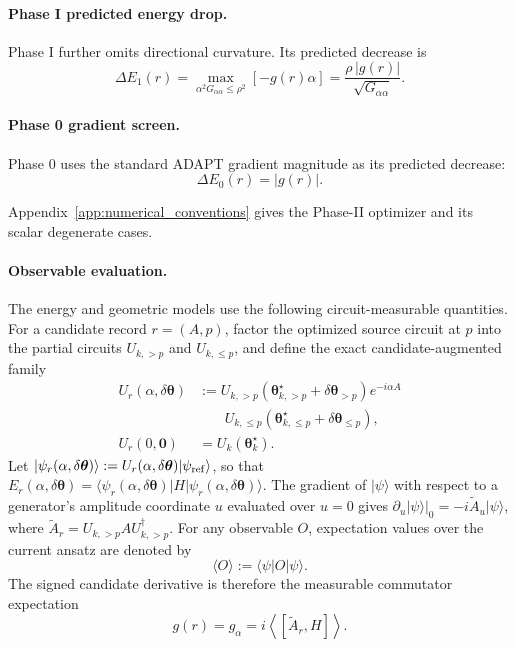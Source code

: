 \documentclass[
  reprint,
  amsmath,
  amssymb,
  aps,
  pra,
  nofootinbib,
  superscriptaddress,
  floatfix
]{revtex4-2}
\newcommand{\ket}[1]{|#1\rangle}
\newcommand{\bra}[1]{\langle #1|}
\begin{document}
\paragraph*{Phase I predicted energy drop.}
Phase I further omits directional curvature. Its predicted decrease is
\begin{equation}
\Delta E_1(r)
=\max_{\alpha^2G_{\alpha\alpha}\le\rho^2}[-g(r)\alpha]
=\frac{\rho\,|g(r)|}{\sqrt{G_{\alpha\alpha}}}.
\label{eq:phase1_gain}
\end{equation}

\paragraph*{Phase 0 gradient screen.}
Phase 0 uses the standard ADAPT gradient magnitude as its predicted decrease:
\begin{equation}
\Delta E_0(r)=\lvert g(r)\rvert.
\label{eq:phase0_gain}
\end{equation}

Appendix~\ref{app:numerical_conventions} gives the Phase-II optimizer and its
scalar degenerate cases.

\paragraph*{Observable evaluation.}
%
The energy and geometric models use the following circuit-measurable quantities.
For a candidate record \(r=(A,p)\), factor the optimized source circuit at
\(p\) into the partial circuits \(U_{k,>p}\) and \(U_{k,\le p}\), and define
the exact candidate-augmented family
\begin{align*}
U_r(\alpha,\delta\boldsymbol{\theta})
&:=
U_{k,>p}\!\left(
\boldsymbol{\theta}_{k,>p}^{\star}
+\delta\boldsymbol{\theta}_{>p}
\right)
e^{-i\alpha A}\\[-0.2em]
&\phantom{{}:={}}\;
U_{k,\le p}\!\left(
\boldsymbol{\theta}_{k,\le p}^{\star}
+\delta\boldsymbol{\theta}_{\le p}
\right),\\
U_r(0,\mathbf 0)
&=U_k(\boldsymbol{\theta}_k^\star).
\end{align*}
Let
\(\ket{\psi_r(\alpha,\delta\boldsymbol\theta)}
:=U_r(\alpha,\delta\boldsymbol\theta)\ket{\psi_{\rm ref}}\), so that
\(E_r(\alpha,\delta\boldsymbol\theta)
=\bra{\psi_r(\alpha,\delta\boldsymbol\theta)}
H\ket{\psi_r(\alpha,\delta\boldsymbol\theta)}\).
The gradient of $\ket{\psi}$ with respect to a generator's amplitude coordinate $u$ evaluated over $u=0$ gives
\(\left.\partial_u\ket{\psi}\right|_0=-i\widetilde A_u\ket{\psi}\), where
\(\widetilde A_r=U_{k,>p}AU_{k,>p}^{\dagger}\).
For any observable \(O\), expectation values over the current ansatz are denoted by
\begin{equation*}
\langle O\rangle:=\langle\psi|O|\psi\rangle.
\end{equation*}
The signed candidate derivative is therefore the measurable commutator
expectation
\begin{equation}
g(r)=g_\alpha
=i\left\langle[\widetilde A_r,H]\right\rangle.
\label{eq:record_gradient}
\end{equation}
\end{document}
